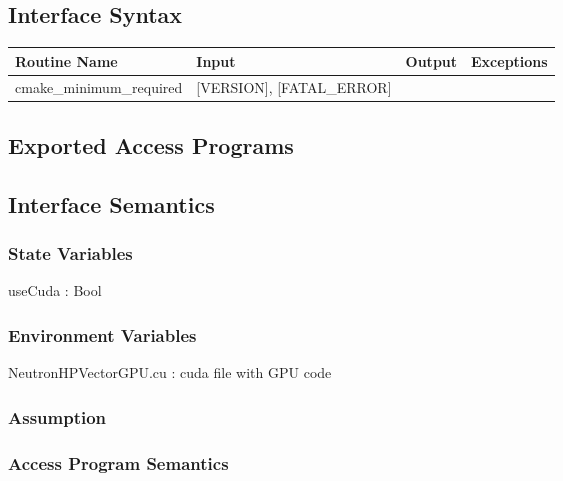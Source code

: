 \documentclass[12pt]{article}
\begin{document}
\subsection{Interface Syntax}%
\begin{tabular}{| p{4cm} | p{4cm} | p{4cm} |  p{4cm} |}
\hline
Routine Name & Input & Output & Exceptions \\ \hline
cmake_minimum_required & [VERSION], [FATAL_ERROR]& & \\ \hline

\end{tabular}

\subsection{Exported Access Programs}%

\subsection{Interface Semantics}

\subsubsection{State Variables}%
useCuda : Bool

\subsubsection{Environment Variables}%
NeutronHPVectorGPU.cu : cuda file with GPU code

\subsubsection{Assumption}%

\subsubsection{Access Program Semantics}%
\end{document}
